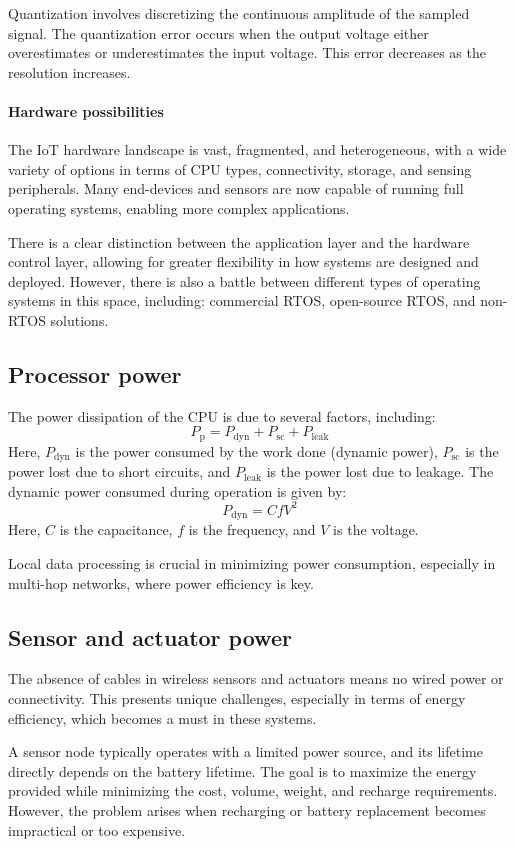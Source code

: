Quantization involves discretizing the continuous amplitude of the sampled signal. 
The quantization error occurs when the output voltage either overestimates or underestimates the input voltage. 
This error decreases as the resolution increases.

\paragraph*{Hardware possibilities}
The IoT hardware landscape is vast, fragmented, and heterogeneous, with a wide variety of options in terms of CPU types, connectivity, storage, and sensing peripherals. 
Many end-devices and sensors are now capable of running full operating systems, enabling more complex applications.

There is a clear distinction between the application layer and the hardware control layer, allowing for greater flexibility in how systems are designed and deployed.
However, there is also a battle between different types of operating systems in this space, including: commercial RTOS, open-source RTOS, and non-RTOS solutions.

\subsection{Processor power}
The power dissipation of the CPU is due to several factors, including:
\[P_{\text{p}}=P_{\text{dyn}}+P_{\text{sc}}+P_{\text{leak}}\]
Here, $P_{\text{dyn}}$ is the power consumed by the work done (dynamic power), $P_{\text{sc}}$ is the power lost due to short circuits, and $P_{\text{leak}}$ is the power lost due to leakage.
The dynamic power consumed during operation is given by:
\[P_{\text{dyn}}=CfV^2\]
Here, $C$ is the capacitance, $f$ is the frequency, and $V$ is the voltage. 

Local data processing is crucial in minimizing power consumption, especially in multi-hop networks, where power efficiency is key.

\subsection{Sensor and actuator power}
The absence of cables in wireless sensors and actuators means no wired power or connectivity. 
This presents unique challenges, especially in terms of energy efficiency, which becomes a must in these systems.

A sensor node typically operates with a limited power source, and its lifetime directly depends on the battery lifetime. 
The goal is to maximize the energy provided while minimizing the cost, volume, weight, and recharge requirements.
However, the problem arises when recharging or battery replacement becomes impractical or too expensive.

